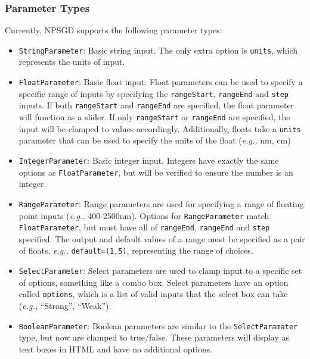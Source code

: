 \documentclass{article}
\begin{document}
\subsubsection{Parameter Types}
\label{sec:ParameterTypes}
Currently, NPSGD supports the following parameter types:
\begin{itemize}
    \item \texttt{StringParameter}: Basic string input. The only extra option is
              \texttt{units}, which represents the units of input.

    \item \texttt{FloatParameter}: Basic float input. Float parameters can be
              used to specify a specific range of inputs by specifying the
              \texttt{rangeStart}, \texttt{rangeEnd} and \texttt{step} inputs. If both
              \texttt{rangeStart} and \texttt{rangeEnd} are specified, the float
              parameter will function as a slider. If only \texttt{rangeStart} or
              \texttt{rangeEnd} are specified, the input will be clamped to values
              accordingly. Additionally, floats take a \texttt{units} parameter that
              can be used to specify the units of the float (\textit{e.g.,} nm, cm)

    \item \texttt{IntegerParameter}: Basic integer input. Integers have exactly
              the same options as \texttt{FloatParameter}, but will be verified to
              ensure the number is an integer.

    \item \texttt{RangeParameter}: Range parameters are used for specifying a
              range of floating point inputs (\textit{e.g.,} 400-2500nm). Options for
              \texttt{RangeParameter} match \texttt{FloatParameter}, but must
              have all of \texttt{rangeEnd}, \texttt{rangeEnd} and \texttt{step}
              specified. The output and default values of a range must be
              specified as a pair of floats, \textit{e.g.,} \texttt{default=(1,5)},
              representing the range of choices.

    \item \texttt{SelectParameter}: Select parameters are used to clamp input to
              a specific set of options, something like a combo box. Select
              parameters have an option called \texttt{options}, which is a list
              of valid inputs that the select box can take (\textit{e.g.,} ``Strong'',
              ``Weak'').

    \item \texttt{BooleanParameter}: Boolean parameters are similar to the
              \texttt{SelectParamater} type, but now are clamped to true/false. 
              These parameters will display as text boxes in HTML and have no
              additional options.
\end{itemize}
\end{document}
